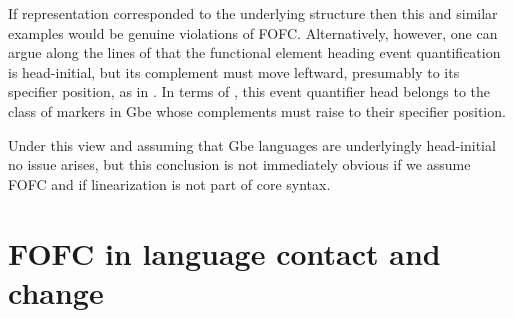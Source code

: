 \documentclass[output=paper]{langsci/langscibook}
\begin{document}
\ea\label{ex:aboh:14.10}
\z

If representation  corresponded to the underlying structure
then this and similar examples would be genuine violations of FOFC.
Alternatively, however, one can argue along the lines of
\citet{VandenBergAboh2013} that the functional element heading event
quantification is head-initial, but its complement must move leftward,
presumably to its specifier position, as in . In terms of
\textcite{Aboh2004a,Aboh2004b,Aboh2010a}, this event quantifier head belongs to
the class of markers in Gbe whose complements must raise to their specifier
position.

\ea\label{ex:aboh:14.11}
\z

Under this view and assuming that Gbe languages are underlyingly head-ini\-tial
no issue arises, but this conclusion is not immediately obvious if we assume
FOFC and if linearization is not part of core syntax.

\section{FOFC in language contact and change}\largerpage
\end{document}
